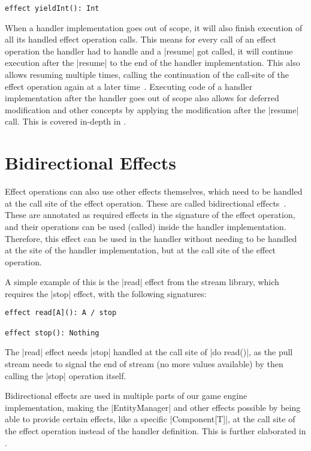 \begin{lstlisting}
effect yieldInt(): Int
\end{lstlisting}

When a handler implementation goes out of scope, it will also finish execution of all its handled effect operation calls. This means for every call of an effect operation the handler had to handle and a |resume| got called, it will continue execution after the |resume| to the end of the handler implementation. This also allows resuming multiple times, calling the continuation of the call-site of the effect operation again at a later time~\cite{brachthauser2020effects,muhcu2025multipleresumptions}. Executing code of a handler implementation after the handler goes out of scope also allows for deferred modification and other concepts by applying the modification after the |resume| call. This is covered in-depth in .

\section{Bidirectional Effects}

Effect operations can also use other effects themselves, which need to be handled at the call site of the effect operation. These are called bidirectional effects~\cite{zhang2020bidirectional}. These are annotated as required effects in the signature of the effect operation, and their operations can be used (called) inside the handler implementation. Therefore, this effect can be used in the handler without needing to be handled at the site of the handler implementation, but at the call site of the effect operation.

A simple example of this is the |read| effect from the stream library, which requires the |stop| effect, with the following signatures:

\begin{lstlisting}
effect read[A](): A / stop

effect stop(): Nothing
\end{lstlisting}

The |read| effect needs |stop| handled at the call site of |do read()|, as the pull stream needs to signal the end of stream (no more values available) by then calling the |stop| operation itself.

Bidirectional effects are used in multiple parts of our game engine implementation, making the |EntityManager| and other effects possible by being able to provide certain effects, like a specific |Component[T]|, at the call site of the effect operation instead of the handler definition. This is further elaborated in .

